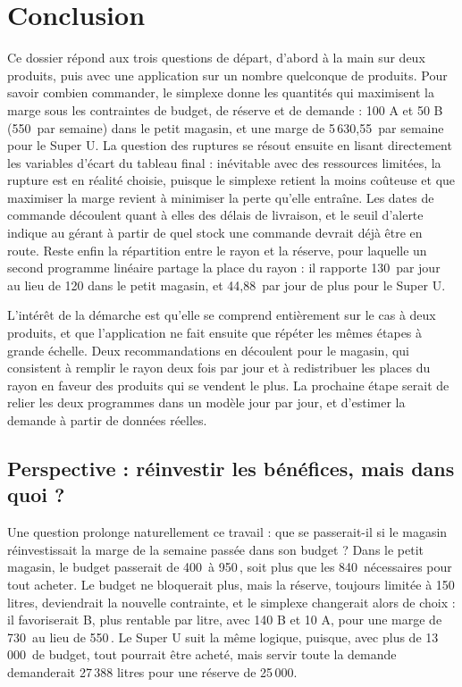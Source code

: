 \documentclass[11pt,a4paper]{article}
\newcommand{\eur}{\,\text{€}}
\begin{document}
\section{Conclusion}
Ce dossier répond aux trois questions de départ, d'abord à la main sur deux produits, puis avec
une application sur un nombre quelconque de produits. Pour savoir combien commander, le
simplexe donne les quantités qui maximisent la marge sous les contraintes de budget, de réserve
et de demande : 100 A et 50 B (550\eur{} par semaine) dans le petit magasin, et une marge de
5\,630,55\eur{} par semaine pour le Super U. La question des ruptures se résout ensuite en
lisant directement les variables d'écart du tableau final : inévitable avec des ressources
limitées, la rupture est en réalité choisie, puisque le simplexe retient la moins coûteuse et
que maximiser la marge revient à minimiser la perte qu'elle entraîne. Les dates de commande
découlent quant à elles des délais de livraison, et le seuil d'alerte indique au gérant à partir
de quel stock une commande devrait déjà être en route. Reste enfin la répartition entre le rayon
et la réserve, pour laquelle un second programme linéaire partage la place du rayon : il
rapporte 130\eur{} par jour au lieu de 120 dans le petit magasin, et 44,88\eur{} par jour de plus
pour le Super U.

L'intérêt de la démarche est qu'elle se comprend entièrement sur le cas à deux produits, et que
l'application ne fait ensuite que répéter les mêmes étapes à grande échelle. Deux
recommandations en découlent pour le magasin, qui consistent à remplir le rayon deux fois par
jour et à redistribuer les places du rayon en faveur des produits qui se vendent le plus. La
prochaine étape serait de relier les deux programmes dans un modèle jour par jour, et d'estimer
la demande à partir de données réelles.

\subsection{Perspective : réinvestir les bénéfices, mais dans quoi ?}
Une question prolonge naturellement ce travail : que se passerait-il si le magasin
réinvestissait la marge de la semaine passée dans son budget ? Dans le petit magasin, le budget
passerait de 400\eur{} à 950\eur, soit plus que les 840\eur{} nécessaires pour tout acheter. Le
budget ne bloquerait plus, mais la réserve, toujours limitée à 150 litres, deviendrait la
nouvelle contrainte, et le simplexe changerait alors de choix : il favoriserait B, plus
rentable par litre, avec 140 B et 10 A, pour une marge de 730\eur{} au lieu de 550\eur. Le
Super U suit la même logique, puisque, avec plus de 13\,000\eur{} de budget, tout pourrait être
acheté, mais servir toute la demande demanderait 27\,388 litres pour une réserve de 25\,000.
\end{document}
